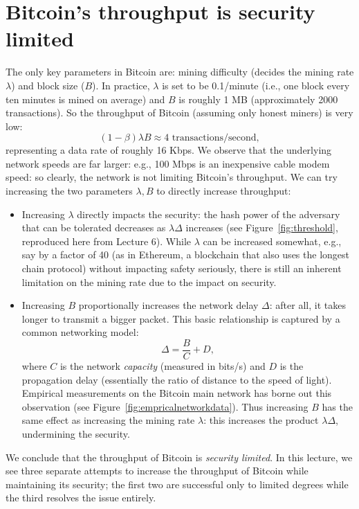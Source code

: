 \documentclass{article}
\begin{document}
\section*{Bitcoin's throughput is security limited}
The only key parameters in Bitcoin are: mining difficulty (decides the mining rate $\lambda$) and block size ($B$). In practice, $\lambda$ is set to be 0.1/minute (i.e., one block every ten minutes is mined on average) and $B$ is roughly 1 MB (approximately 2000 transactions). So the throughput of Bitcoin (assuming only honest miners) is very low:
$$
(1-\beta)\lambda B \approx 4 \mbox{ transactions/second}, 
$$
representing a data rate of roughly 16 Kbps. We observe that the underlying network speeds are far larger: e.g., 100 Mbps is an inexpensive cable modem speed: so clearly, the network is not limiting Bitcoin's throughput. We can try increasing the two parameters $\lambda, B$ to directly increase throughput: 
\begin{itemize}
\item  Increasing $\lambda$ directly impacts the security: the hash power of the adversary that can be tolerated decreases as $\lambda \Delta$ increases (see Figure~\ref{fig:threshold}, reproduced here from Lecture 6). While $\lambda$ can be increased somewhat, e.g., say by a factor of 40 (as in Ethereum, a blockchain that also uses the longest chain protocol) without impacting safety seriously, there is still an inherent limitation on the mining rate due to the impact on security. 
\item Increasing $B$ proportionally increases the network delay $\Delta$: after all, it takes longer to transmit a bigger packet. This basic relationship is captured by a common networking model:
$$\Delta = \frac{B}{C} + D, $$
where $C$ is the network {\em capacity} (measured in bits/s) and $D$ is the propagation delay (essentially the ratio of distance to the speed of light). Empirical measurements on the Bitcoin main network has borne out this observation (see Figure~\ref{fig:empricalnetworkdata}). Thus increasing $B$
 has the same effect as increasing the mining rate $\lambda$:
 this increases the product $\lambda \Delta$, undermining the security. 
 \end{itemize} 
 We conclude that the throughput of Bitcoin is {\em security limited}. 
In this lecture, we see three separate attempts to increase the throughput of Bitcoin while maintaining its security; the first two are successful only to limited degrees while the third resolves the issue entirely. 
\end{document}
